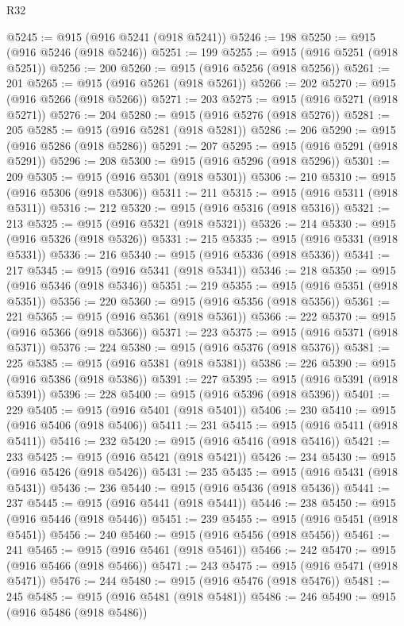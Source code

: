 \begin{lexlean}{R32}
\begin{coremodule}
@5245 := @915 (@916 @5241 (@918 @5241))
@5246 := 198
@5250 := @915 (@916 @5246 (@918 @5246))
@5251 := 199
@5255 := @915 (@916 @5251 (@918 @5251))
@5256 := 200
@5260 := @915 (@916 @5256 (@918 @5256))
@5261 := 201
@5265 := @915 (@916 @5261 (@918 @5261))
@5266 := 202
@5270 := @915 (@916 @5266 (@918 @5266))
@5271 := 203
@5275 := @915 (@916 @5271 (@918 @5271))
@5276 := 204
@5280 := @915 (@916 @5276 (@918 @5276))
@5281 := 205
@5285 := @915 (@916 @5281 (@918 @5281))
@5286 := 206
@5290 := @915 (@916 @5286 (@918 @5286))
@5291 := 207
@5295 := @915 (@916 @5291 (@918 @5291))
@5296 := 208
@5300 := @915 (@916 @5296 (@918 @5296))
@5301 := 209
@5305 := @915 (@916 @5301 (@918 @5301))
@5306 := 210
@5310 := @915 (@916 @5306 (@918 @5306))
@5311 := 211
@5315 := @915 (@916 @5311 (@918 @5311))
@5316 := 212
@5320 := @915 (@916 @5316 (@918 @5316))
@5321 := 213
@5325 := @915 (@916 @5321 (@918 @5321))
@5326 := 214
@5330 := @915 (@916 @5326 (@918 @5326))
@5331 := 215
@5335 := @915 (@916 @5331 (@918 @5331))
@5336 := 216
@5340 := @915 (@916 @5336 (@918 @5336))
@5341 := 217
@5345 := @915 (@916 @5341 (@918 @5341))
@5346 := 218
@5350 := @915 (@916 @5346 (@918 @5346))
@5351 := 219
@5355 := @915 (@916 @5351 (@918 @5351))
@5356 := 220
@5360 := @915 (@916 @5356 (@918 @5356))
@5361 := 221
@5365 := @915 (@916 @5361 (@918 @5361))
@5366 := 222
@5370 := @915 (@916 @5366 (@918 @5366))
@5371 := 223
@5375 := @915 (@916 @5371 (@918 @5371))
@5376 := 224
@5380 := @915 (@916 @5376 (@918 @5376))
@5381 := 225
@5385 := @915 (@916 @5381 (@918 @5381))
@5386 := 226
@5390 := @915 (@916 @5386 (@918 @5386))
@5391 := 227
@5395 := @915 (@916 @5391 (@918 @5391))
@5396 := 228
@5400 := @915 (@916 @5396 (@918 @5396))
@5401 := 229
@5405 := @915 (@916 @5401 (@918 @5401))
@5406 := 230
@5410 := @915 (@916 @5406 (@918 @5406))
@5411 := 231
@5415 := @915 (@916 @5411 (@918 @5411))
@5416 := 232
@5420 := @915 (@916 @5416 (@918 @5416))
@5421 := 233
@5425 := @915 (@916 @5421 (@918 @5421))
@5426 := 234
@5430 := @915 (@916 @5426 (@918 @5426))
@5431 := 235
@5435 := @915 (@916 @5431 (@918 @5431))
@5436 := 236
@5440 := @915 (@916 @5436 (@918 @5436))
@5441 := 237
@5445 := @915 (@916 @5441 (@918 @5441))
@5446 := 238
@5450 := @915 (@916 @5446 (@918 @5446))
@5451 := 239
@5455 := @915 (@916 @5451 (@918 @5451))
@5456 := 240
@5460 := @915 (@916 @5456 (@918 @5456))
@5461 := 241
@5465 := @915 (@916 @5461 (@918 @5461))
@5466 := 242
@5470 := @915 (@916 @5466 (@918 @5466))
@5471 := 243
@5475 := @915 (@916 @5471 (@918 @5471))
@5476 := 244
@5480 := @915 (@916 @5476 (@918 @5476))
@5481 := 245
@5485 := @915 (@916 @5481 (@918 @5481))
@5486 := 246
@5490 := @915 (@916 @5486 (@918 @5486))

\end{coremodule}
\end{lexlean}
